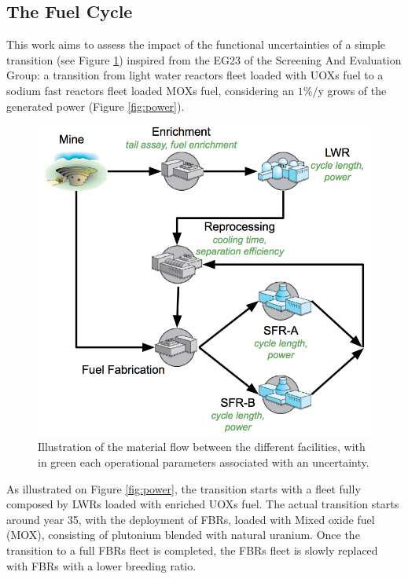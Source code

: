 \documentclass{anstrans}
\begin{document}
\subsection{The Fuel Cycle}
This work aims to assess the impact of the functional uncertainties of a
simple transition (see Figure \ref{fig:cycle}) inspired from the EG23 of the Screening And
Evaluation Group\cite{FCO}: a transition from light water reactors fleet loaded
with \glspl{UOX} fuel to a sodium fast reactors fleet loaded \glspl{MOX} fuel, considering an
$1\%/$y grows of the generated power (Figure \ref{fig:power}).
\begin{figure}[ht] %
  \centering
  \includegraphics[scale=0.31]{cycle.png}
  \caption{Illustration of the material flow between the different facilities,
  with in green each operational parameters associated with an
  uncertainty.}\label{fig:cycle}
\end{figure}

As illustrated on Figure \ref{fig:power}, the transition starts with a fleet
fully composed by \glspl{LWR} loaded with enriched \glspl{UOX} fuel. The actual
transition starts around year 35, with the deployment of \glspl{FBR}, loaded
with Mixed oxide fuel (MOX), consisting of plutonium blended with natural
uranium. Once the transition to a full \glspl{FBR} fleet is completed, the
\glspl{FBR} fleet is slowly replaced with \glspl{FBR} with a lower breeding
ratio. 
\end{document}
